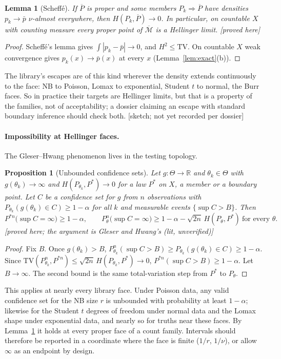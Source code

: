 \documentclass[11pt]{article}
\newcommand{\bM}{\overline{\mathcal M}}
\newcommand{\bP}{\overline P}
\newcommand{\status}[1]{\textsf{[#1]}}
\newtheorem{proposition}[theorem]{Proposition}
\newtheorem{lemma}[theorem]{Lemma}
\theoremstyle{definition}
\theoremstyle{remark}
\begin{document}
\begin{lemma}[Scheff\'e]\label{lem:scheffe}
If $\bP$ is proper and some members $P_k\Rightarrow\bP$ have densities
$p_k\to\bar p$ $\nu$-almost everywhere, then $H(P_k,\bP)\to0$. In particular,
on countable $X$ with counting measure every proper point of $\bM$ is a
Hellinger limit. \status{proved here}
\end{lemma}
\begin{proof}
Scheff\'e's lemma gives $\int|p_k-\bar p|\to0$, and $H^2\le\mathrm{TV}$. On
countable $X$ weak convergence gives $p_k(x)\to\bar p(x)$ at every $x$
(Lemma~\ref{lem:exact}(b)).
\end{proof}
The library's escapes are of this kind wherever the density extends
continuously to the face: NB to Poisson, Lomax to exponential, Student $t$
to normal, the Burr faces. So in practice their targets are Hellinger
limits, but that is a property of the families, not of acceptability; a
dossier claiming an escape with standard boundary inference should check
both. \status{sketch; not yet recorded per dossier}

\paragraph{Impossibility at Hellinger faces.} The Gleser--Hwang phenomenon
\cite{gleserhwang,dufour,bertanhamoreira} lives in the testing topology.

\begin{proposition}[Unbounded confidence sets]\label{prop:gh}
Let $g:\Theta\to\mathbb R$ and $\theta_k\in\Theta$ with $g(\theta_k)\to\infty$
and $H(P_{\theta_k},P^*)\to0$ for a law $P^*$ on $X$, a member or a boundary
point. Let $C$ be a confidence set for $g$ from $n$ observations with
$P_{\theta_k}(g(\theta_k)\in C)\ge1-\alpha$ for all $k$ and measurable events
$\{\sup C>B\}$. Then
\[
 P^{*n}\bigl(\sup C=\infty\bigr)\ge1-\alpha,\qquad
 P_\theta^n\bigl(\sup C=\infty\bigr)\ge1-\alpha-\sqrt{2n}\,H(P_\theta,P^*)
 \ \text{for every }\theta.
\]
\status{proved here; the argument is Gleser and Hwang's
\cite{gleserhwang} (lit, unverified)}
\end{proposition}
\begin{proof}
Fix $B$. Once $g(\theta_k)>B$,
$P^n_{\theta_k}(\sup C>B)\ge P_{\theta_k}(g(\theta_k)\in C)\ge1-\alpha$. Since
$\mathrm{TV}(P^n_{\theta_k},P^{*n})\le\sqrt{2n}\,H(P_{\theta_k},P^*)\to0$,
$P^{*n}(\sup C>B)\ge1-\alpha$. Let $B\to\infty$. The second bound is the same
total-variation step from $P^*$ to $P_\theta$.
\end{proof}
This applies at nearly every library face. Under Poisson data, any valid
confidence set for the NB size $r$ is unbounded with probability at least
$1-\alpha$; likewise for the Student $t$ degrees of freedom under normal
data and the Lomax shape under exponential data, and nearly so for truths
near these faces. By Lemma~\ref{lem:scheffe} it holds at every proper face
of a count family. Intervals should therefore be reported in a coordinate
where the face is finite ($1/r$, $1/\nu$), or allow $\infty$ as an endpoint
by design.
\end{document}
